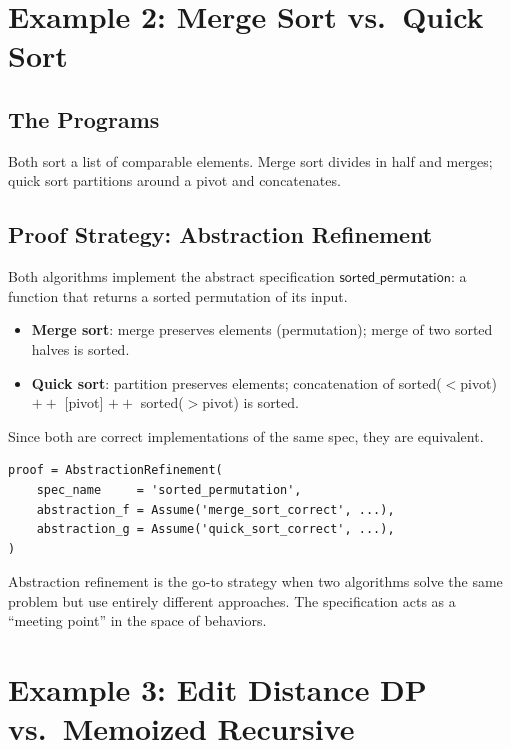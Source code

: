 \section{Example 2: Merge Sort vs.\ Quick Sort}

\subsection{The Programs}
Both sort a list of comparable elements.  Merge sort divides in half and
merges; quick sort partitions around a pivot and concatenates.

\subsection{Proof Strategy: Abstraction Refinement}

Both algorithms implement the abstract specification
$\mathsf{sorted\_permutation}$: a function that returns a sorted
permutation of its input.

\begin{itemize}
\item \textbf{Merge sort}: merge preserves elements (permutation); merge
  of two sorted halves is sorted.
\item \textbf{Quick sort}: partition preserves elements; concatenation of
  sorted(${}<{}$pivot) $\mathbin{+\!\!+}$ [pivot] $\mathbin{+\!\!+}$ sorted(${}>{}$pivot) is sorted.
\end{itemize}

Since both are correct implementations of the same spec, they are
equivalent.

\begin{lstlisting}
proof = AbstractionRefinement(
    spec_name     = 'sorted_permutation',
    abstraction_f = Assume('merge_sort_correct', ...),
    abstraction_g = Assume('quick_sort_correct', ...),
)
\end{lstlisting}

\begin{remark}
Abstraction refinement is the go-to strategy when two algorithms solve
the same problem but use entirely different approaches.  The
specification acts as a ``meeting point'' in the space of behaviors.
\end{remark}


\section{Example 3: Edit Distance DP vs.\ Memoized Recursive}

